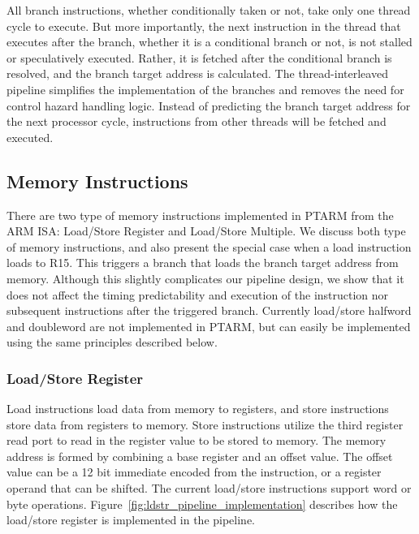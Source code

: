 All branch instructions, whether conditionally taken or not, take only one thread cycle to execute.
But more importantly, the next instruction in the thread that executes after the branch, whether it is a conditional branch or not, is not stalled or speculatively executed.
Rather, it is fetched after the conditional branch is resolved, and the branch target address is calculated. 
The thread-interleaved pipeline simplifies the implementation of the branches and removes the need for control hazard handling logic.
Instead of predicting the branch target address for the next processor cycle, instructions from other threads will be fetched and executed.

\subsection{Memory Instructions}
There are two type of memory instructions implemented in PTARM from the ARM ISA: Load/Store Register and Load/Store Multiple.
We discuss both type of memory instructions, and also present the special case when a load instruction loads to R15.
This triggers a branch that loads the branch target address from memory.  
Although this slightly complicates our pipeline design, we show that it does not affect the timing predictability and execution of the instruction nor subsequent instructions after the triggered branch.
Currently load/store halfword and doubleword are not implemented in PTARM, but can easily be implemented using the same principles described below.       
  
\subsubsection{Load/Store Register}
\label{sec:ptarm_instruction_ldstr}
Load instructions load data from memory to registers, and store instructions store data from registers to memory.
Store instructions utilize the third register read port to read in the register value to be stored to memory.
The memory address is formed by combining a base register and an offset value.
The offset value can be a 12 bit immediate encoded from the instruction, or a register operand that can be shifted.
The current load/store instructions support word or byte operations.
Figure~\ref{fig:ldstr_pipeline_implementation} describes how the load/store register is implemented in the pipeline.

